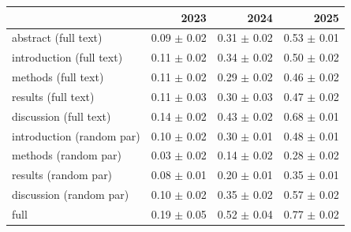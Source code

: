 \begin{tabular}{lrrr}
\toprule
 & 2023 & 2024 & 2025 \\
\midrule
abstract (full text)        & 0.09 $\pm$ 0.02 & 0.31 $\pm$ 0.02 & 0.53 $\pm$ 0.01\\
\midrule
introduction (full text)    & 0.11 $\pm$ 0.02 & 0.34 $\pm$ 0.02 & 0.50 $\pm$ 0.02\\
methods (full text)         & 0.11 $\pm$ 0.02 & 0.29 $\pm$ 0.02 & 0.46 $\pm$ 0.02\\
results (full text)         & 0.11 $\pm$ 0.03 & 0.30 $\pm$ 0.03 & 0.47 $\pm$ 0.02\\
discussion (full text)      & 0.14 $\pm$ 0.02 & 0.43 $\pm$ 0.02 & 0.68 $\pm$ 0.01 \\
\midrule
introduction (random par)   & 0.10 $\pm$ 0.02 & 0.30 $\pm$ 0.01 & 0.48 $\pm$ 0.01\\
methods (random par)        & 0.03 $\pm$ 0.02 & 0.14 $\pm$ 0.02 & 0.28 $\pm$ 0.02\\
results (random par)        & 0.08 $\pm$ 0.01 & 0.20 $\pm$ 0.01 & 0.35 $\pm$ 0.01\\
discussion (random par)     & 0.10 $\pm$ 0.02 & 0.35 $\pm$ 0.02 & 0.57 $\pm$ 0.02 \\
\midrule
full                        & 0.19 $\pm$ 0.05 & 0.52 $\pm$ 0.04 & 0.77 $\pm$ 0.02\\
\bottomrule
\end{tabular}
